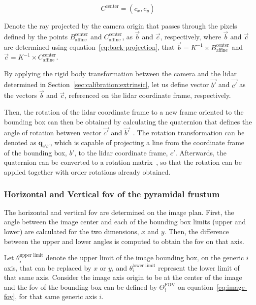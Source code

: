 \begin{equation}
\label{eq:image-pixel-center}
C^\text{center} = (c_x, c_y)
\end{equation}

Denote  the ray projected by the camera origin that passes through the pixels defined by the points $B^\text{center}_\text{affine}$ and $C^\text{center}_\text{affine}$, as $\vec{b}$ and $\vec{c}$, respectively, where $\vec{b}$ and $\vec{c}$ are determined using equation~\eqref{eq:back-projection}, that $\vec{b} = K^{-1} \times B^\text{center}_\text{affine}$ and $\vec{c} = K^{-1} \times C^\text{center}_\text{affine}$.

By applying the rigid body transformation between the camera and the \ac{lidar} determined in Section~\ref{sec:calibration:extrinsic}, let us define vector $\vec{b'}$ and $\vec{c'}$ as the vectors $\vec{b}$ and $\vec{c}$, referenced on the \ac{lidar} coordinate frame, respectively.

Then, the rotation of the \ac{lidar} coordinate frame to a new frame oriented to the bounding box can then be obtained by calculating the quaternion that defines the angle of rotation between vector $\vec{c'}$ and $\vec{b'}$~\cite{mvg_book}. The rotation transformation can be denoted as $\mathbf{q}_{c'b'}$, which is capable of projecting a line from the coordinate frame of the bounding box, $b'$, to the \ac{lidar} coordinate frame, $c'$. Afterwards, the quaternion can be converted to a rotation matrix~\cite{Dai2015, mvg_book}, so that the rotation can be applied together with order rotations already obtained.

\subsubsection{Horizontal and Vertical \ac{fov} of the pyramidal frustum}
The horizontal and vertical \ac{fov} are determined on the image plan. First, the angle between the image center and each of the bounding box limits (upper and lower) are calculated for the two dimensions, $x$ and $y$. Then, the difference between the upper and lower angles is computed to obtain the \ac{fov} on that axis.

Let $\theta^\text{upper limit}_i$ denote the upper limit of the image bounding box, on the generic $i$ axis, that can be replaced by $x$ or $y$, and $\theta^\text{lower limit}_i$ represent the lower limit of that same axis. Consider the image axis origin to be at the center of the image and the \ac{fov} of the bounding box can be defined by $\Theta^\text{FOV}_i$ on equation~\eqref{eq:image-fov}, for that same generic axis $i$.

